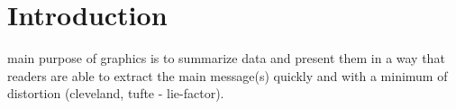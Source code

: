 \section{Introduction}
%
%



% 
% 
% 
% 
   main purpose of graphics is to summarize data and present them in a way that readers are able to extract the main message(s) quickly and with a minimum of distortion (cleveland, tufte - lie-factor). 

